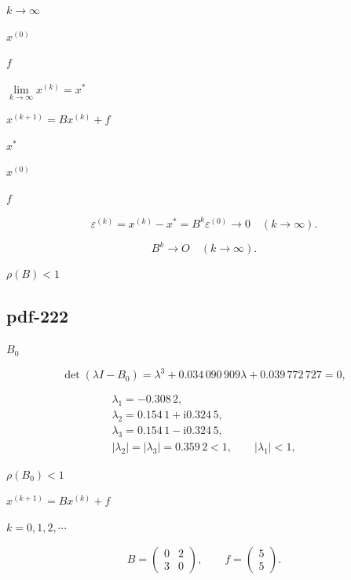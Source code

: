 \documentclass[UTF8,fontset=fandol]{ctexart}
\begin{document}
$k\to\infty$\par

$x^{(0)}$\par

$f$\par

$\lim\limits_{k\to\infty}x^{(k)}=x^*$\par

$x^{(k+1)}=Bx^{(k)}+f$\par

$x^*$\par

$x^{(0)}$\par

$f$\par

\[
\varepsilon^{(k)}=x^{(k)}-x^*=B^k\varepsilon^{(0)}\to0\quad(k\to\infty).
\]

\[
B^k\to O\quad(k\to\infty).
\]

$\rho(B)<1$\par

\subsection*{pdf-222}

$B_0$\par

\[
\det(\lambda I-B_0)=\lambda^3+0.034\,090\,909\lambda+0.039\,772\,727=0,
\]

\[
\begin{gathered}
\lambda_1=-0.308\,2,\\
\lambda_2=0.154\,1+\mathrm i0.324\,5,\\
\lambda_3=0.154\,1-\mathrm i0.324\,5,\\
|\lambda_2|=|\lambda_3|=0.359\,2<1,\qquad|\lambda_1|<1,
\end{gathered}
\]

$\rho(B_0)<1$\par

$x^{(k+1)}=Bx^{(k)}+f$\par

$k=0,1,2,\cdots$\par

\[
B=\begin{pmatrix}0&2\\3&0\end{pmatrix},\qquad f=\begin{pmatrix}5\\5\end{pmatrix}.
\]
\end{document}

